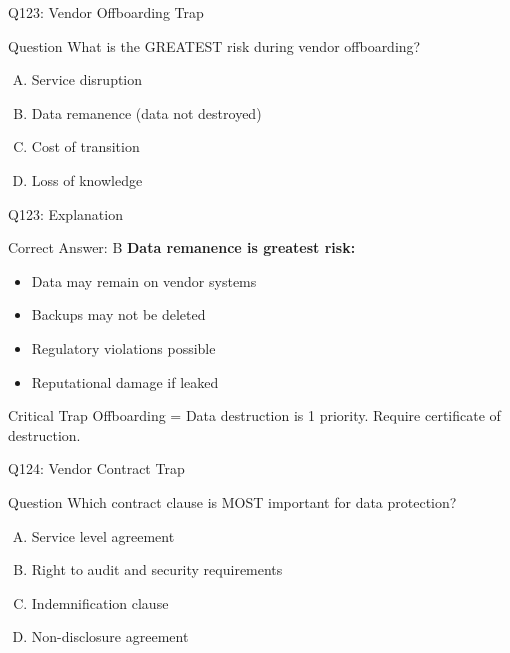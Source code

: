 \documentclass{beamer}
\begin{document}
	\begin{frame}{Q123: Vendor Offboarding Trap}
		\begin{block}{Question}
			What is the GREATEST risk during vendor offboarding?
		\end{block}
		\begin{enumerate}[(A)]
			\item Service disruption
			\item Data remanence (data not destroyed)
			\item Cost of transition
			\item Loss of knowledge
		\end{enumerate}
	\end{frame}
	
	\begin{frame}{Q123: Explanation}
		\begin{block}{Correct Answer: B}
			\textbf{Data remanence is greatest risk:}
			\begin{itemize}
				\item Data may remain on vendor systems
				\item Backups may not be deleted
				\item Regulatory violations possible
				\item Reputational damage if leaked
			\end{itemize}
		\end{block}
		\begin{alertblock}{Critical Trap}
			Offboarding = Data destruction is 1 priority.
			Require certificate of destruction.
		\end{alertblock}
	\end{frame}
	
	\begin{frame}{Q124: Vendor Contract Trap}
		\begin{block}{Question}
			Which contract clause is MOST important for data protection?
		\end{block}
		\begin{enumerate}[(A)]
			\item Service level agreement
			\item Right to audit and security requirements
			\item Indemnification clause
			\item Non-disclosure agreement
		\end{enumerate}
	\end{frame}
	
\end{document}
